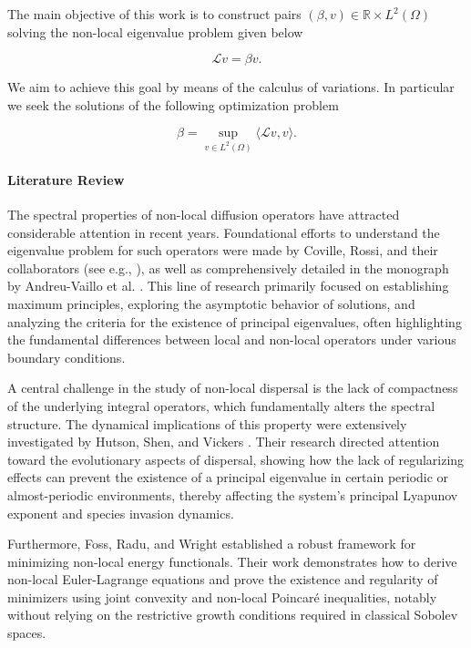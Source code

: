 \documentclass[11pt, a4paper]{article}
\theoremstyle{break}
\theoremstyle{break}
\theoremstyle{break}
\theoremstyle{break}
\theoremstyle{break}
\theoremstyle{break}
\theoremstyle{break}
\theoremstyle{break}
\theoremstyle{break}
\begin{document}
The main objective of this work is to construct pairs $(\beta, v) \in \mathbb{R}\times L^2(\Omega)$ solving the non-local eigenvalue problem given below

\begin{equation}
    \label{eq:nonlocal_eigenvalue_problem}
    \mathcal{L} v = \beta v.
\end{equation}

We aim to achieve this goal by means of the calculus of variations. In particular we seek the solutions of the following optimization problem

\begin{equation}
    \beta = \sup_{v \in L^2(\Omega)} \langle \mathcal{L} v, v\rangle.
\end{equation}

\paragraph{Literature Review}

The spectral properties of non-local diffusion operators have attracted considerable attention in recent years. Foundational efforts to understand the eigenvalue problem for such operators were made by Coville, Rossi, and their collaborators (see e.g., \cite{ChasseigneChavesRossi2006, Coville2010, GarciaMelianRossi2009}), as well as comprehensively detailed in the monograph by Andreu-Vaillo et al. \cite{AndreuVaillo2010}. This line of research primarily focused on establishing maximum principles, exploring the asymptotic behavior of solutions, and analyzing the criteria for the existence of principal eigenvalues, often highlighting the fundamental differences between local and non-local operators under various boundary conditions.

A central challenge in the study of non-local dispersal is the lack of compactness of the underlying integral operators, which fundamentally alters the spectral structure. The dynamical implications of this property were extensively investigated by Hutson, Shen, and Vickers \cite{HutsonShenVickers2008}. Their research directed attention toward the evolutionary aspects of dispersal, showing how the lack of regularizing effects can prevent the existence of a principal eigenvalue in certain periodic or almost-periodic environments, thereby affecting the system's principal Lyapunov exponent and species invasion dynamics.

Furthermore, Foss, Radu, and Wright \cite{FossRaduWright2021} established a robust framework for minimizing non-local energy functionals. Their work demonstrates how to derive non-local Euler-Lagrange equations and prove the existence and regularity of minimizers using joint convexity and non-local Poincar\'e inequalities, notably without relying on the restrictive growth conditions required in classical Sobolev spaces.
\end{document}
